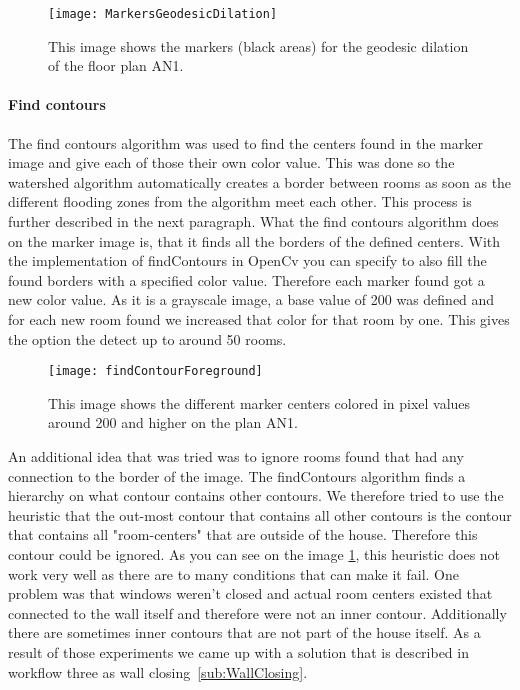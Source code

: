 \begin{figure}[H]
	\centering
	\texttt{[image: MarkersGeodesicDilation]}
	\caption{This image shows the markers (black areas) for the geodesic dilation of the floor plan AN1.}
	\label{fig:geodesicDilation}
\end{figure}

\paragraph{Find contours}
\label{sub:FindContours}
The find contours algorithm was used to find the centers found in the marker image and give each of those their own color value. This was done so the watershed algorithm automatically creates a border between rooms as soon as the different flooding zones from the algorithm meet each other. This process is further described in the next paragraph. What the find contours algorithm does on the marker image is, that it finds all the borders of the defined centers. With the implementation of findContours in OpenCv you can specify to also fill the found borders with a specified color value. Therefore each marker found got a new color value. As it is a grayscale image, a base value of 200 was defined and for each new room found we increased that color for that room by one. This gives the option the detect up to around 50 rooms.

\begin{figure}[H]
	\centering
	\texttt{[image: findContourForeground]}
	\caption{This image shows the different marker centers colored in pixel values around 200 and higher on the plan AN1.}
	\label{fig:findContour}
\end{figure}


An additional idea that was tried was to ignore rooms found that had any connection to the border of the image. The findContours algorithm finds a hierarchy on what contour contains other contours. We therefore tried to use the heuristic that the out-most contour that contains all other contours is the contour that contains all "room-centers" that are outside of the house. Therefore this contour could be ignored. As you can see on the image \ref{fig:geodesicDilation}, this heuristic does not work very well as there are to many conditions that can make it fail. One problem was that windows weren't closed and actual room centers existed that connected to the wall itself and therefore were not an inner contour. Additionally there are sometimes inner contours that are not part of the house itself. As a result of those experiments we came up with a solution that is described in workflow three as wall closing~\ref{sub:WallClosing}.

